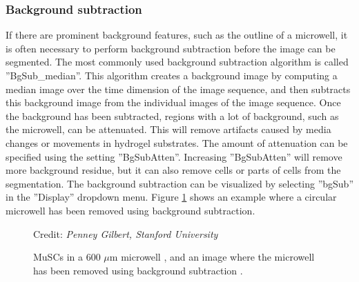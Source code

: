 \documentclass[a4paper, oneside, onecolumn, 11pt]{article}
\newcommand{\setting}[1]{''#1''}
\newcommand{\credit}[1]{\raggedleft \scriptsize Credit:\emph{ #1}}
\begin{document}
\subsubsection{Background subtraction}
\label{sec:bgsub}
If there are prominent background features, such as the outline of a microwell, it is often necessary to perform background subtraction before the image can be segmented. The most commonly used background subtraction algorithm is called \setting{BgSub\_median}. This algorithm creates a background image by computing a median image over the time dimension of the image sequence, and then subtracts this background image from the individual images of the image sequence. Once the background has been subtracted, regions with a lot of background, such as the microwell, can be attenuated. This will remove artifacts caused by media changes or movements in hydrogel substrates. The amount of attenuation can be specified using the setting \setting{BgSubAtten}. Increasing \setting{BgSubAtten} will remove more background residue, but it can also remove cells or parts of cells from the segmentation. The background subtraction can be visualized by selecting \setting{bgSub} in the \setting{Display} dropdown menu. Figure \ref{fig:MuSC-bgsub} shows an example where a circular microwell has been removed using background subtraction.

\begin{figure}[!htb]
\begin{center}
\credit{Penney Gilbert, Stanford University}\\
\qquad
{}
\caption{MuSCs in a 600 $\mu$m microwell \protect{}, and an image where the microwell has been removed using background subtraction \protect{}.}
\label{fig:MuSC-bgsub}
\end{center}
\end{figure}
\end{document}
